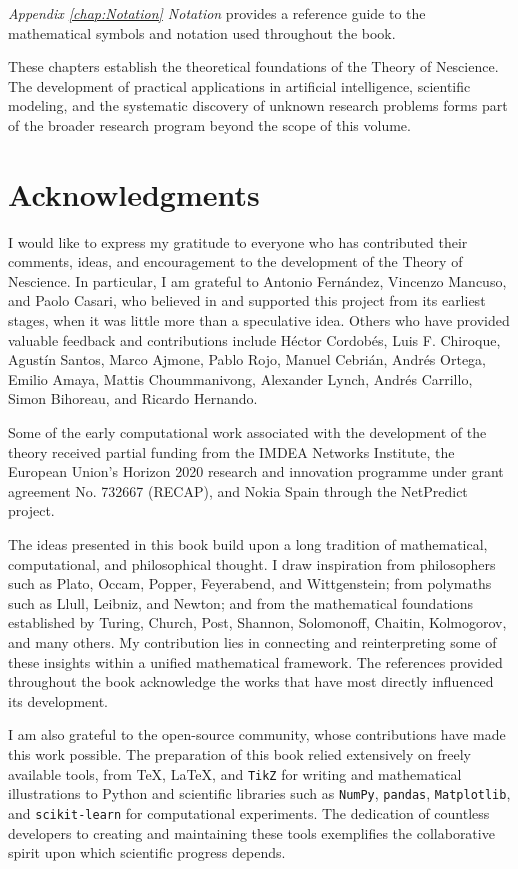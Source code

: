 \emph{Appendix \ref{chap:Notation} Notation} provides a reference guide to the mathematical symbols and notation used throughout the book.

These chapters establish the theoretical foundations of the Theory of Nescience. The development of practical applications in artificial intelligence, scientific modeling, and the systematic discovery of unknown research problems forms part of the broader research program beyond the scope of this volume.

%
%

\section*{Acknowledgments}

I would like to express my gratitude to everyone who has contributed their comments, ideas, and encouragement to the development of the Theory of Nescience. In particular, I am grateful to Antonio Fernández, Vincenzo Mancuso, and Paolo Casari, who believed in and supported this project from its earliest stages, when it was little more than a speculative idea. Others who have provided valuable feedback and contributions include Héctor Cordobés, Luis F. Chiroque, Agustín Santos, Marco Ajmone, Pablo Rojo, Manuel Cebrián, Andrés Ortega, Emilio Amaya, Mattis Choummanivong, Alexander Lynch, Andrés Carrillo, Simon Bihoreau, and Ricardo Hernando.

Some of the early computational work associated with the development of the theory received partial funding from the IMDEA Networks Institute, the European Union's Horizon 2020 research and innovation programme under grant agreement No. 732667 (RECAP), and Nokia Spain through the NetPredict project.

The ideas presented in this book build upon a long tradition of mathematical, computational, and philosophical thought. I draw inspiration from philosophers such as Plato, Occam, Popper, Feyerabend, and Wittgenstein; from polymaths such as Llull, Leibniz, and Newton; and from the mathematical foundations established by Turing, Church, Post, Shannon, Solomonoff, Chaitin, Kolmogorov, and many others. My contribution lies in connecting and reinterpreting some of these insights within a unified mathematical framework. The references provided throughout the book acknowledge the works that have most directly influenced its development.

I am also grateful to the open-source community, whose contributions have made this work possible. The preparation of this book relied extensively on freely available tools, from \TeX{}, \LaTeX{}, and \texttt{TikZ} for writing and mathematical illustrations to Python and scientific libraries such as \texttt{NumPy}, \texttt{pandas}, \texttt{Matplotlib}, and \texttt{scikit-learn} for computational experiments. The dedication of countless developers to creating and maintaining these tools exemplifies the collaborative spirit upon which scientific progress depends.

